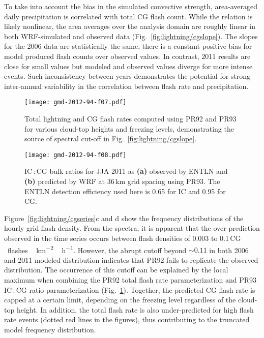 To take into account the bias in the simulated convective strength,
area-averaged daily precipitation is correlated with total CG flash count.
While the relation is likely nonlinear, the area averages over the analysis
domain are roughly linear in both WRF-simulated and observed data
(Fig.~\ref{fig:lightning/cgslope}). The slopes for the 2006 data are statistically the
same, there is a constant positive bias for model produced flash counts over
observed values. In contrast, 2011 results are close for small values but
modeled and observed values diverge for more intense events. Such
inconsistency between years demonstrates the potential for strong
inter-annual variability in the correlation between flash rate and
precipitation.



\begin{figure}[t]
\texttt{[image: gmd-2012-94-f07.pdf]}
\caption{Total lightning and CG flash rates computed using PR92 and PR93 for
various cloud-top heights and freezing levels, demonstrating the source of
spectral cut-off in Fig.~\ref{fig:lightning/cgslope}.} \label{fig:lightning/pr9293}
\end{figure}

\begin{figure}[t]
\texttt{[image: gmd-2012-94-f08.pdf]}
\caption{IC\,:\,CG bulk ratios for JJA 2011 as \textbf{(a)} observed by
 ENTLN and \textbf{(b)} predicted by WRF at 36\,\unit{km} grid spacing
 using PR93. The ENTLN detection efficiency used here is
 0.65 for IC and 0.95 for CG. }
 \label{fig:lightning/iccgmap}
\end{figure}






Figure~\ref{fig:lightning/cgseries}c and d show the frequency
distributions of the hourly grid flash density. From the spectra, it is
apparent that the over-prediction observed in the time series occurs between
flash densities of 0.003 to 0.1\,\unit{CG\,flashes\,km^{-2}\,h^{-1}}.
However, the abrupt cutoff beyond $\sim0.11$ in both 2006 and 2011 modeled
distribution indicates that PR92 fails to replicate the observed
distribution. The occurrence of this cutoff can be explained by the local
maximum when combining the PR92 total flash rate parameterization and PR93
IC\,:\,CG ratio parameterization (Fig.~\ref{fig:lightning/pr9293}). Together, the
predicted CG flash rate is capped at a certain limit, depending on the
freezing level regardless of the cloud-top height. In addition, the total
flash rate is also under-predicted for high flash rate events (dotted red
lines in the figures), thus contributing to the truncated model frequency
distribution.

